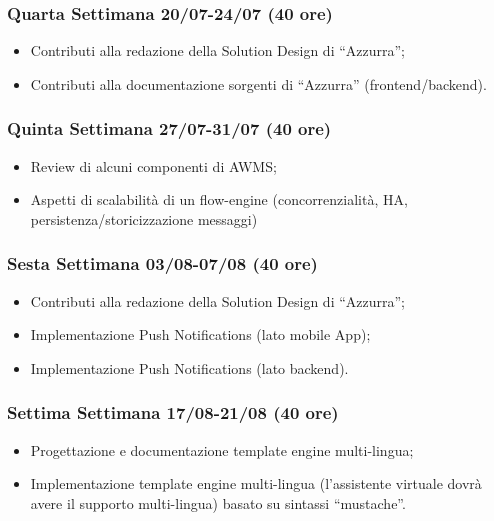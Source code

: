 \begin{trivlist}
\item \subsubsection{Quarta Settimana 20/07-24/07  (40 ore)}
\begin{itemize}
	\item Contributi alla redazione della Solution Design di “Azzurra”;
	\item Contributi alla documentazione sorgenti di “Azzurra” (frontend/backend).
\end{itemize}

\item \subsubsection{Quinta Settimana 27/07-31/07 (40 ore)}
\begin{itemize}
	\item Review di alcuni componenti di \gls{AWMS}\ap{[g]};
	\item Aspetti di scalabilità di un flow-engine (concorrenzialità, HA, persistenza/storicizzazione
	messaggi)
\end{itemize}

\item \subsubsection{Sesta Settimana 03/08-07/08 (40 ore)}
\begin{itemize}
	\item Contributi alla redazione della Solution Design di “Azzurra”;
	\item Implementazione Push Notifications (lato mobile App);
	\item Implementazione Push Notifications (lato backend).
\end{itemize}

\item \subsubsection{Settima Settimana 17/08-21/08 (40 ore)}
\begin{itemize}
	\item Progettazione e documentazione template engine multi-lingua;
	\item Implementazione template engine multi-lingua (l’assistente virtuale dovrà avere il supporto multi-lingua) basato su sintassi “mustache”.
\end{itemize}	


\end{trivlist}
